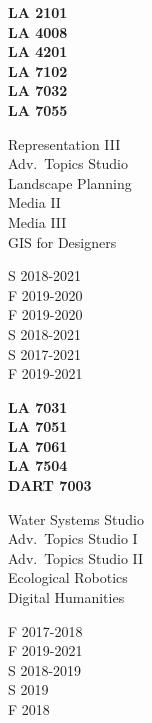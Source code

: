 \documentclass[]{baharmon-cv}
\begin{document}
\begin{minipage}[t]{0.1\textwidth} 
\textbf{LA 2101}\\
\textbf{LA 4008}\\
\textbf{LA 4201}\\
\textbf{LA 7102}\\
\textbf{LA 7032}\\
\textbf{LA 7055}\\
\end{minipage}
\begin{minipage}[t]{0.2\textwidth} 
Representation III\\
Adv.~Topics Studio\\
Landscape Planning \\
Media II \\
Media III\\
GIS for Designers\\
\end{minipage}
\begin{minipage}[t]{0.2\textwidth} 
S 2018-2021\\
F 2019-2020\\
F 2019-2020\\
S 2018-2021\\
S 2017-2021\\
F 2019-2021\\
\end{minipage}
\begin{minipage}[t]{0.15\textwidth} 
\textbf{LA 7031}\\
\textbf{LA 7051}\\
\textbf{LA 7061}\\
\textbf{LA 7504}\\
\textbf{DART 7003}\\
\end{minipage}
\begin{minipage}[t]{0.2\textwidth} 
Water Systems Studio\\
Adv.~Topics Studio I\\
Adv.~Topics Studio II\\
Ecological Robotics\\
Digital Humanities\\
\end{minipage}
\begin{minipage}[t]{0.15\textwidth} 
F 2017-2018\\
F 2019-2021\\
S 2018-2019\\
S 2019\\
F 2018\\
\end{minipage}
\end{document}
